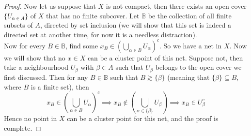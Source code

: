 \documentclass[../../main.tex]{subfiles}
\begin{document}
\begin{proof}
Now let us suppose that $X$ is not compact, then there exists an open cover $\{U_{\alpha\in A}\}$ of $X$ that has no finite subcover. Let $\mathbb{B}$ be the collection of all finite subsets of $A$, directed by set inclusion (we will show that this set is indeed a directed set at another time, for now it is a needless distraction).\\

Now for every $B\in\mathbb{B}$, find some $x_B\in \left(\bigcup_{\alpha\in B} U_\alpha\right)^c$. So we have a net in $X$. Now we will show that no $x\in X$ can be a cluster point of this net. Suppose not, then take a neighbourhood $U_\beta$ with $\beta\in A$ such that $U_\beta$ belongs to the open cover we first discussed. Then for any $B\in \mathbb{B}$ such that $B\gtrsim\{\beta\}$ (meaning that $\{\beta\}\subseteq B$, where $B$ is a finite set), then
\[
x_B\in\left(\bigcup_{\alpha\in B}U_\alpha\right)^c\implies x_B\notin\left(\bigcup_{\alpha\in \{\beta\}}U_\beta\right)\implies x_B\in U_\beta^c
\]
Hence no point in $X$ can be a cluster point for this net, and the proof is complete.
\end{proof}
\end{document}
